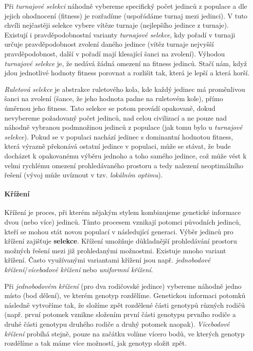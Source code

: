 Při \emph{turnajové selekci} náhodně vybereme specifický počet jedinců z
populace a dle jejich ohodnocení (fitness) je rozřadíme (uspořádáme turnaj mezi
jedinci). V tuto chvíli nejčastěji selekce vybere vítěze turnaje (nejlepšího
jedince z turnaje). Existují i pravděpodobnostní varianty \emph{turnajové
selekce}, kdy pořadí v turnaji určuje pravděpodobnost zvolení daného jedince
(vítěz turnaje nejvyšší pravděpodobnost, další v pořadí mají klesající šanci na
zvolení). Výhodou \emph{turnajové selekce} je, že nedává žádná omezení na
fitness jedinců. Stačí nám, když jdou jednotlivé hodnoty fitness porovnat a
rozlišit tak, která je lepší a která horší.

\emph{Ruletová selekce} je abstrakce ruletového kola, kde každý jedinec má
proměnlivou šanci na zvolení (šance, že jeho hodnota padne na ruletovém kole),
přímo úměrnou jeho fitness. Tato selekce se potom provádí opakovaně, dokud
nevybereme požadovaný počet jedinců, nad celou civilizací a ne pouze nad
náhodně vybranou podmnožinou jedinců z populace (jak tomu bylo u
\emph{turnajové selekce}). Pokud se v populaci nachází jedinec s dominantní
hodnotou fitness, která výrazně překonává ostatní jedince v populaci, může se
stávat, že bude docházet k opakovanému výběru jednoho a toho samého jedince,
což může vést k velmi rychlému omezení prohledávaného prostoru a tedy nalezení
neoptimálního řešení (vývoj může uvíznout v tzv. \emph{lokálním optimu}).

\paragraph{Křížení}
Křížení je proces, při kterém nějakým stylem kombinujeme genetické informace
dvou (nebo více) jedinců. Tímto procesem vznikají potomci původních jedinců,
kteří se mohou stát novou populací v následující generaci. Výběr jedinců pro
křížení zajišťuje \textbf{selekce}. Křížení umožňuje důkladnější prohledávání
prostoru možných řešení mezi již prohledanými možnostmi. Existuje mnoho variant
křížení. Často využívanými variantami křížení jsou např. \emph{jednobodové
křížení}/\emph{vícebodové křížení} nebo \emph{uniformní křížení}.

Při \emph{jednobodovém křížení} (pro dva rodičovské jedince) vybereme náhodně
jedno místo (bod dělení), ve kterém genotyp rozdělíme. Genetickou informaci
potomků následně vytvoříme tak, že složíme zpět rozdělené části genotypů
různých rodičů (např. první potomek vznikne složením první části genotypu
prvního rodiče a druhé části genotypu druhého rodiče a druhý potomek naopak).
\emph{Vícebodové křížení} probíhá stejně, pouze na začátku volíme vícero bodů,
ve kterých genotyp rozdělíme a tak máme více možností, jak genotyp složit zpět.

